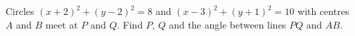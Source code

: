 Circles $(x+2)^2+(y-2)^2=8$ and $(x-3)^2+(y+1)^2=10$ with centres $A$ and $B$ meet at $P$ and $Q$. Find $P$, $Q$ and the angle between lines $PQ$ and $AB$.
